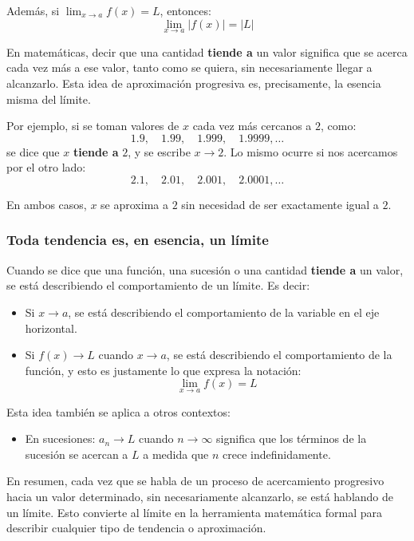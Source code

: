 \documentclass[12pt]{article}
\begin{document}
Además, si $\displaystyle \lim_{x \to a} f(x) = L$, entonces:
\[
\lim_{x \to a} |f(x)| = |L|
\]




En matemáticas, decir que una cantidad \textbf{tiende a} un valor significa que se acerca cada vez más a ese valor, tanto como se quiera, sin necesariamente llegar a alcanzarlo. Esta idea de aproximación progresiva es, precisamente, la esencia misma del límite.

Por ejemplo, si se toman valores de $x$ cada vez más cercanos a $2$, como:
\[
1.9,\quad 1.99,\quad 1.999,\quad 1.9999,\ldots
\]
se dice que $x$ \textbf{tiende a} $2$, y se escribe $x \to 2$. Lo mismo ocurre si nos acercamos por el otro lado:
\[
2.1,\quad 2.01,\quad 2.001,\quad 2.0001,\ldots
\]

En ambos casos, $x$ se aproxima a $2$ sin necesidad de ser exactamente igual a $2$.



\subsubsection{Toda tendencia es, en esencia, un límite}


Cuando se dice que una función, una sucesión o una cantidad \textbf{tiende a} un valor, se está describiendo el comportamiento de un límite. Es decir:

\begin{itemize}
    \item Si $x \to a$, se está describiendo el comportamiento de la variable en el eje horizontal.
    \item Si $f(x) \to L$ cuando $x \to a$, se está describiendo el comportamiento de la función, y esto es justamente lo que expresa la notación:
    \[
    \lim_{x \to a} f(x) = L
    \]
\end{itemize}

Esta idea también se aplica a otros contextos:

\begin{itemize}
    \item En sucesiones: $a_n \to L$ cuando $n \to \infty$ significa que los términos de la sucesión se acercan a $L$ a medida que $n$ crece indefinidamente.
\end{itemize}

En resumen, cada vez que se habla de un proceso de acercamiento progresivo hacia un valor determinado, sin necesariamente alcanzarlo, se está hablando de un límite. Esto convierte al límite en la herramienta matemática formal para describir cualquier tipo de tendencia o aproximación.
\end{document}
